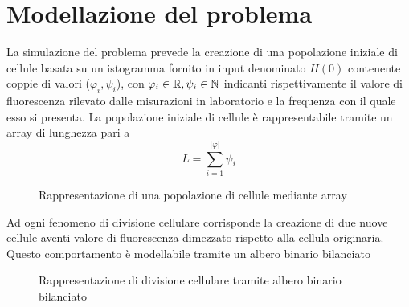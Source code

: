 \section{Modellazione del problema}

La simulazione del problema prevede la creazione di una popolazione iniziale
di cellule basata su un istogramma fornito in input denominato $H(0)$
contenente coppie di valori ($\varphi_{i}, \psi_{i}$),
con $\varphi_{i} \in \mathbb{R}, \psi_{i} \in \mathbb{N}$ indicanti rispettivamente il
valore di fluorescenza rilevato dalle misurazioni in laboratorio e
la frequenza con il quale esso si presenta.
La popolazione iniziale di cellule è rappresentabile tramite un array di
lunghezza pari a $$L = \sum_{i=1}^{|\varphi|} \psi_{i}$$

\begin{figure}[H]
\centering
{}
\caption{Rappresentazione di una popolazione di cellule mediante array}
\end{figure}

Ad ogni fenomeno di divisione cellulare corrisponde
la creazione di due nuove cellule aventi valore di fluorescenza dimezzato
rispetto alla cellula originaria.
Questo comportamento è modellabile tramite un albero binario bilanciato

\begin{figure}[H]
\centering
{}
\caption{Rappresentazione di divisione cellulare tramite albero binario
    bilanciato}
\end{figure}

